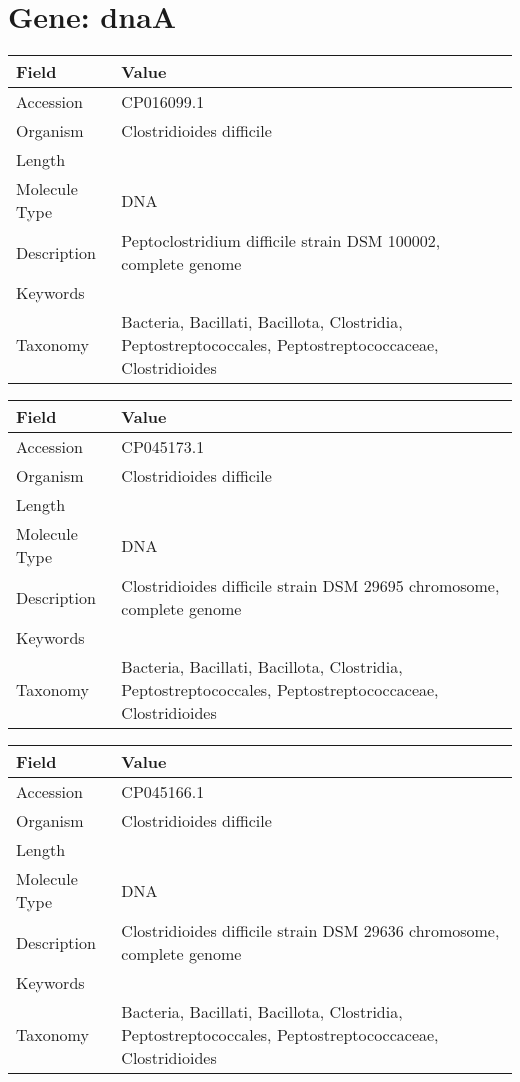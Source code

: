 \documentclass[10pt]{article}
\begin{document}
\section*{Gene: dnaA}
{\footnotesize
\begin{longtable}{>{\raggedright\arraybackslash}p{4.5cm} >{\raggedright\arraybackslash}p{11.5cm}}
\textbf{Field} & \textbf{Value} \\
\hline
Accession & CP016099.1 \\
Organism & Clostridioides difficile \\
Length & 4208574 \\
Molecule Type & DNA \\
Description & Peptoclostridium difficile strain DSM 100002, complete genome \\
Keywords &  \\
Taxonomy & Bacteria, Bacillati, Bacillota, Clostridia, Peptostreptococcales, Peptostreptococcaceae, Clostridioides \\
\end{longtable}
}

{\footnotesize
\begin{longtable}{>{\raggedright\arraybackslash}p{4.5cm} >{\raggedright\arraybackslash}p{11.5cm}}
\textbf{Field} & \textbf{Value} \\
\hline
Accession & CP045173.1 \\
Organism & Clostridioides difficile \\
Length & 4320488 \\
Molecule Type & DNA \\
Description & Clostridioides difficile strain DSM 29695 chromosome, complete genome \\
Keywords &  \\
Taxonomy & Bacteria, Bacillati, Bacillota, Clostridia, Peptostreptococcales, Peptostreptococcaceae, Clostridioides \\
\end{longtable}
}

{\footnotesize
\begin{longtable}{>{\raggedright\arraybackslash}p{4.5cm} >{\raggedright\arraybackslash}p{11.5cm}}
\textbf{Field} & \textbf{Value} \\
\hline
Accession & CP045166.1 \\
Organism & Clostridioides difficile \\
Length & 4162984 \\
Molecule Type & DNA \\
Description & Clostridioides difficile strain DSM 29636 chromosome, complete genome \\
Keywords &  \\
Taxonomy & Bacteria, Bacillati, Bacillota, Clostridia, Peptostreptococcales, Peptostreptococcaceae, Clostridioides \\
\end{longtable}
}
\end{document}
